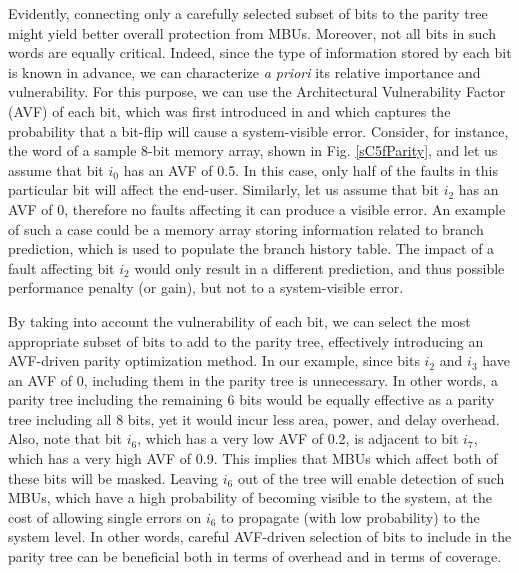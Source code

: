 \documentclass[12pt]{yalephd}
\begin{document}
Evidently, connecting only a carefully selected subset of bits to the parity tree might yield better overall protection from MBUs. Moreover, not all bits in such words are equally critical. Indeed, since the type of information stored by each bit is known in advance, we can characterize {\it a priori} its relative importance and vulnerability. For this purpose, we can use the Architectural Vulnerability Factor (AVF) of each bit, which was first introduced in \cite{MWERA03} and which captures the probability that a bit-flip will cause a system-visible error. Consider, for instance, the word of a sample 8-bit memory array, shown in Fig. \ref{sC5fParity}, and let us assume that bit $i_0$ has an AVF of 0.5. In this case, only half of the faults in this particular bit will affect the end-user. Similarly, let us assume that bit $i_2$ has an AVF of 0, therefore no faults affecting it can produce a visible error. An example of such a case could be a memory array storing information related to branch prediction, which is used to populate the branch history table. The impact of a fault affecting bit $i_2$ would only result in a different prediction, and thus possible performance penalty (or gain), but not to a system-visible error.

By taking into account the vulnerability of each bit, we can select the most appropriate subset of bits to add to the parity tree, effectively introducing an AVF-driven parity optimization method. In our example, since bits $i_2$ and $i_3$ have an AVF of 0, including them in the parity tree is unnecessary. In other words, a parity tree including the remaining 6 bits would be equally effective as a parity tree including all 8 bits, yet it would incur less area, power, and delay overhead. Also, note that bit $i_6$, which has a very low AVF of 0.2, is adjacent to bit $i_7$, which has a very high AVF of 0.9. This implies that MBUs which affect both of these bits will be masked. Leaving $i_6$ out of the tree will enable detection of such MBUs, which have a high probability of becoming visible to the system, at the cost of allowing single errors on $i_6$ to propagate (with low probability) to the system level. In other words, careful AVF-driven selection of bits to include in the parity tree can be beneficial both in terms of overhead and in terms of coverage.
\end{document}
